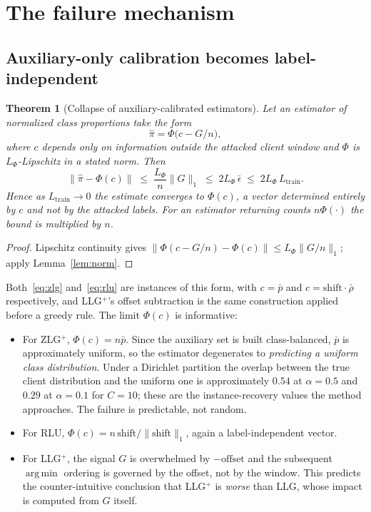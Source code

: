 \documentclass[11pt]{article}
\newtheorem{theorem}{Theorem}
\theoremstyle{remark}
\DeclareMathOperator*{\argmin}{arg\,min}
\begin{document}
\section{The failure mechanism}
\label{sec:failure}

\subsection{Auxiliary-only calibration becomes label-independent}

\begin{theorem}[Collapse of auxiliary-calibrated estimators]
\label{thm:collapse}
Let an estimator of normalized class proportions take the form
\[
 \widehat\pi = \Phi\bigl(c - G/n\bigr),
\]
where $c$ depends only on information outside the attacked client window and
$\Phi$ is $L_\Phi$-Lipschitz in a stated norm. Then
\begin{equation}
 \bigl\|\widehat\pi - \Phi(c)\bigr\|
 \;\le\; \frac{L_\Phi}{n}\|G\|_1
 \;\le\; 2L_\Phi\,\bar\epsilon
 \;\le\; 2L_\Phi\,L_{\mathrm{train}} .
 \label{eq:collapse}
\end{equation}
Hence as $L_{\mathrm{train}} \to 0$ the estimate converges to $\Phi(c)$, a
vector determined entirely by $c$ and not by the attacked labels. For an
estimator returning counts $n\Phi(\cdot)$ the bound is multiplied by $n$.
\end{theorem}

\begin{proof}
Lipschitz continuity gives
$\|\Phi(c - G/n) - \Phi(c)\| \le L_\Phi \|G/n\|_1$; apply
Lemma~\ref{lem:norm}.
\end{proof}

Both~\eqref{eq:zlg} and~\eqref{eq:rlu} are instances of this form, with
$c = \bar p$ and $c = \mathrm{shift}\cdot\bar\rho$ respectively, and
LLG$^+$'s offset subtraction is the same construction applied before a greedy
rule. The limit $\Phi(c)$ is informative:

\begin{itemize}
\item For ZLG$^+$, $\Phi(c) = n\bar p$. Since the auxiliary set is built
  class-balanced, $\bar p$ is approximately uniform, so the estimator
  degenerates to \emph{predicting a uniform class distribution}. Under a
  Dirichlet partition the overlap between the true client distribution and
  the uniform one is approximately $0.54$ at $\alpha = 0.5$ and $0.29$ at
  $\alpha = 0.1$ for $C = 10$; these are the instance-recovery values the
  method approaches. The failure is predictable, not random.
\item For RLU, $\Phi(c) = n\,\mathrm{shift}/\|\mathrm{shift}\|_1$, again a
  label-independent vector.
\item For LLG$^+$, the signal $G$ is overwhelmed by $-\mathrm{offset}$ and
  the subsequent $\argmin$ ordering is governed by the offset, not by the
  window. This predicts the counter-intuitive conclusion that LLG$^+$ is
  \emph{worse} than LLG, whose impact is computed from $G$ itself.
\end{itemize}
\end{document}
